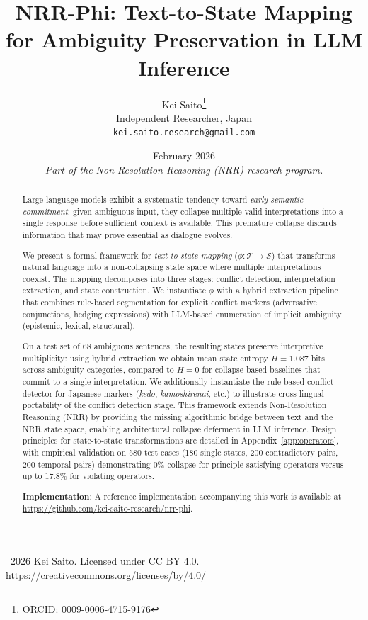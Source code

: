 \documentclass[11pt,a4paper]{article}
\title{\textbf{NRR-Phi: Text-to-State Mapping for Ambiguity Preservation in LLM Inference}}
\author{
  Kei Saito\thanks{ORCID: 0009-0006-4715-9176} \\
  Independent Researcher, Japan \\
  \texttt{kei.saito.research@gmail.com}
}
\date{February 2026 \\[0.5em]
\textit{Part of the Non-Resolution Reasoning (NRR) research program.}}
\begin{document}
\maketitle

\begin{center}
\textcopyright\ 2026 Kei Saito.
Licensed under CC BY 4.0.\\
\url{https://creativecommons.org/licenses/by/4.0/}
\end{center}

\begin{abstract}
Large language models exhibit a systematic tendency toward \textit{early semantic commitment}: 
given ambiguous input, they collapse multiple valid interpretations into a single response 
before sufficient context is available. This premature collapse discards information that 
may prove essential as dialogue evolves.

We present a formal framework for \textit{text-to-state mapping} ($\phi: \mathcal{T} \to \mathcal{S}$) 
that transforms natural language into a non-collapsing state space where multiple interpretations 
coexist. The mapping decomposes into three stages: conflict detection, interpretation extraction, 
and state construction. We instantiate $\phi$ with a hybrid extraction pipeline that combines 
rule-based segmentation for explicit conflict markers (adversative conjunctions, hedging expressions) 
with LLM-based enumeration of implicit ambiguity (epistemic, lexical, structural).

On a test set of 68 ambiguous sentences, the resulting states preserve interpretive multiplicity: 
using hybrid extraction we obtain mean state entropy $H = 1.087$ bits across ambiguity categories, 
compared to $H = 0$ for collapse-based baselines that commit to a single interpretation. 
We additionally instantiate the rule-based conflict detector for Japanese markers 
(\textit{kedo}, \textit{kamoshirenai}, etc.) to illustrate cross-lingual portability of the 
conflict detection stage. This framework extends Non-Resolution Reasoning (NRR) by providing 
the missing algorithmic bridge between text and the NRR state space, enabling architectural 
collapse deferment in LLM inference. Design principles for state-to-state transformations 
are detailed in Appendix~\ref{app:operators}, with empirical validation on 580 test cases 
(180 single states, 200 contradictory pairs, 200 temporal pairs) demonstrating 
0\% collapse for principle-satisfying operators versus up to 17.8\% for violating operators.

\textbf{Implementation}: A reference implementation accompanying this work 
is available at \url{https://github.com/kei-saito-research/nrr-phi}.
\end{abstract}
\end{document}
